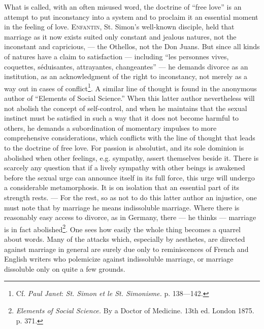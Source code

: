 \documentclass[12pt,a4paper,openany]{book}
\newcommand{\opage}[1]{\marginnote{\footnotesize\textit{[#1]}}}
\begin{document}
What is called, with an often misused word, the doctrine of ``free love'' is an attempt to put inconstancy into a system
and to proclaim it an essential moment in the feeling of love. \textsc{Enfantin}, St. Simon's well-known disciple, held
that marriage as it now exists suited only constant and jealous natures, not the inconstant and capricious, --- the
Othellos, not the Don Juans. But since all kinds of natures have a claim to satisfaction --- including ``les personnes
vives, coquettes, séduisantes, attrayantes, changeantes'' --- he demands divorce as an institution, as an acknowledgment
of the right to inconstancy, not merely as a way out in cases of conflict\footnote[1]{Cf. \emph{Paul Janet}: \textit{St.
Simon et le St. Simonisme.} p. 138---142.}. A similar line of thought is found in the anonymous author of ``Elements of
Social Science.'' When this latter author nevertheless will not abolish the concept of self-control, and when he
maintains that the sexual instinct must be satisfied in such a way that it does not become harmful to others, he
demands a subordination of momentary impulses to more comprehensive considerations, which conflicts with the line of
thought that leads to the doctrine of free love. For passion is absolutist, and its sole dominion is abolished when
other feelings, e.g. sympathy, assert themselves beside it. There is scarcely any question that if a lively sympathy
with other beings is awakened before the sexual urge can announce itself in its full force, this urge will undergo a
considerable metamorphosis. It is on isolation that an essential part of its strength rests. --- For the rest, so as
not to do this latter author an injustice, one must note that by marriage he means indissoluble marriage. Where there is
reasonably easy access to divorce, as in Germany, there --- he thinks --- marriage is in fact
abolished\footnote[2]{\textit{Elements of Social Science.} By a Doctor of Medicine. 13th ed. London 1875. p. 371.}. One
sees how easily the whole thing becomes a quarrel about words. Many of the attacks which, especially by aesthetes, are
directed against marriage in
\opage{290}general are surely due only to reminiscences of French and English writers who polemicize against
indissoluble marriage, or marriage dissoluble only on quite a few grounds.
\end{document}

